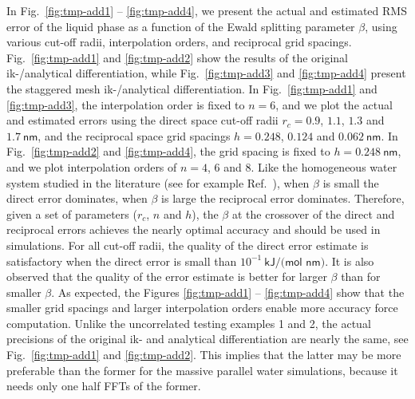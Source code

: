 \documentclass[aps,pre,preprint,unsortedaddress]{revtex4}
\newcommand{\recheck}[1]{{\color{red} #1}}
\begin{document}
\recheck{
In Fig.~\ref{fig:tmp-add1} -- \ref{fig:tmp-add4}, we present the 
actual and estimated RMS error of the liquid phase as a function of
the Ewald splitting parameter $\beta$, using various cut-off radii,
interpolation orders, and reciprocal grid spacings.
Fig.~\ref{fig:tmp-add1} and \ref{fig:tmp-add2} show the results of the
original ik-/analytical differentiation,
while Fig.~\ref{fig:tmp-add3} and \ref{fig:tmp-add4} present
the staggered mesh ik-/analytical differentiation.
In
Fig.~\ref{fig:tmp-add1} and \ref{fig:tmp-add3},
the interpolation order is fixed to $n=6$,
and we plot the actual and estimated errors using the direct space
cut-off radii $r_c = 0.9$, $1.1$, $1.3$ and $1.7\:\textsf{nm}$, and
the reciprocal space grid spacings $h = 0.248$, $0.124$ and
$0.062\:\textsf{nm}$. In Fig.~\ref{fig:tmp-add2} and \ref{fig:tmp-add4}, the 
grid spacing is fixed to $h = 0.248\:\textsf{nm}$, and
we plot interpolation orders of $n=4$, 6 and 8.
Like the
homogeneous water system studied in the literature (see for
example Ref.~\cite{wang2010optimizing, ballenegger2012convert}),
when $\beta$ is small the direct error dominates, when  $\beta$ is
large the reciprocal error dominates.
Therefore, given a set of parameters ($r_c$, $n$ and $h$),
the $\beta$ at the crossover of the direct and reciprocal errors
achieves the nearly optimal accuracy and should be used in simulations.
For all cut-off radii,
the quality of the direct error estimate is satisfactory when the
direct error is small than $10^{-1}\:\textsf{kJ/(mol nm)}$.
It is also observed that the quality of the error estimate is better
for larger $\beta$ than for smaller $\beta$.
As expected, the Figures \ref{fig:tmp-add1} -- \ref{fig:tmp-add4} show that
the smaller grid spacings and larger interpolation orders
enable more accuracy force computation. 
Unlike the uncorrelated testing examples 1 and 2, the actual precisions of the 
original ik- and analytical differentiation are nearly the same,
see Fig.~\ref{fig:tmp-add1} and \ref{fig:tmp-add2}.
This implies that the latter may be more preferable than
the former for the massive parallel water simulations,
because it needs only one half FFTs of the former.
}
\end{document}
